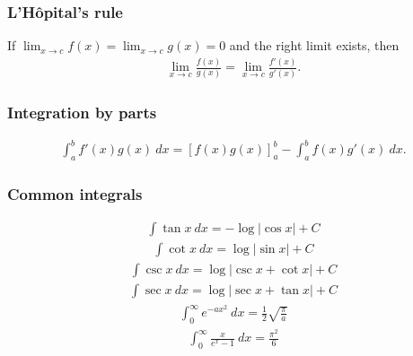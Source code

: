 

\subsubsection{L'Hôpital's rule}
If $\lim_{x\to c} f(x) = \lim_{x \to c} g(x) = 0$ and the right limit exists, then
\begin{align*}
    \lim_{x \to c} \frac{f(x)}{g(x)} = \lim_{x \to c} \frac{f'(x)}{g'(x)}.
\end{align*}

\subsubsection{Integration by parts}
\begin{align*}
    \int_a^b f'(x)g(x)\ dx = \left[f(x)g(x)\right]_a^b - \int_a^b f(x)g'(x)\ dx.
\end{align*}

\subsubsection{Common integrals}
\begin{align*}
    \int \tan x\ dx = -\log|\cos x| + C
\end{align*}
\begin{align*}
    \int \cot x\ dx = \log|\sin x| + C
\end{align*}
\begin{align*}
    \int \csc x\ dx = \log|\csc x + \cot x| + C
\end{align*}
\begin{align*}
    \int \sec x\ dx = \log|\sec x + \tan x| + C
\end{align*}
\begin{align*}
    \int_0^\infty e^{-ax^2}\ dx = \frac12\sqrt{\frac \pi a}
\end{align*}
\begin{align*}
    \int_0^\infty \frac x{e^x - 1}\ dx = \frac{\pi^2}6
\end{align*}

